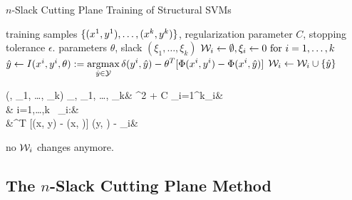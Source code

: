 \begin{algorithm*}[t]
    \caption{$n$-Slack Cutting Plane Training of Structural SVMs \label{alg_n_slack}}
    \begin{doublespacing}
    \begin{algorithmic}[1]
        \Require training samples $\{ (x^{1}, y^{1}), \dots, (x^{k}, y^{k})\}$, regularization parameter $C$, stopping tolerance $\epsilon$.
        \Ensure parameters $\theta$, slack $(\xi_1, \dotsc, \xi_k)$
        \State $\mathcal{W}_i \leftarrow \emptyset, \xi_i \leftarrow 0 \text{ for } i=1,\dots,k$
        \Repeat
                \State
                $\hat{y} \leftarrow I(x^{i}, y^{i}, \theta) := \displaystyle \operatorname*{argmax}_{\hat{y}\in\mathcal{Y}} \delta(y^{i}, \hat{y}) - \theta^T [\Phi(x^{i}, y^{i}) - \Phi(x^{i}, \hat{y})] $
                \State \hspace{-3mm}$\mathcal{W}_i \leftarrow \mathcal{W}_i \cup \{ \hat{y}\} $
                    \State
                    \vspace{-15mm}
                    \begin{flalign*}
                        \qquad\qquad(\theta, \xi_1, \dots, \xi_k) \leftarrow \displaystyle \argmin_{\theta, \xi_1, \dots, \xi_k}& ^2 + C \sum_{i=1}^k\xi_i&\\
                        &  i=1,\dots,k\ \forall {} \in \W_i:&\\
                                    &\theta^T [\Phi(x, y) - \Phi(x, )] \geq \delta(y, ) - \xi_i&
                    \end{flalign*}
                \EndIf
            \EndFor
            \vspace{-10mm}
            \Until no $\mathcal{W}_i$ changes anymore.
        \end{algorithmic}
    \end{doublespacing}
    \end{algorithm*}

\subsection{The $n$-Slack Cutting Plane Method}

